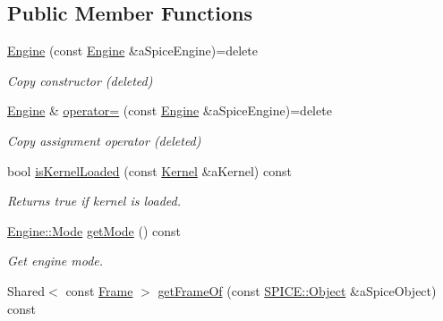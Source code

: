 \subsection*{Public Member Functions}
\begin{DoxyCompactItemize}
\item 
\hyperlink{classostk_1_1physics_1_1env_1_1ephem_1_1spice_1_1_engine_a60734f4383f29cfaaaa50126fef0ceb5}{Engine} (const \hyperlink{classostk_1_1physics_1_1env_1_1ephem_1_1spice_1_1_engine}{Engine} \&a\+Spice\+Engine)=delete
\begin{DoxyCompactList}\small\item\em Copy constructor (deleted) \end{DoxyCompactList}\item 
\hyperlink{classostk_1_1physics_1_1env_1_1ephem_1_1spice_1_1_engine}{Engine} \& \hyperlink{classostk_1_1physics_1_1env_1_1ephem_1_1spice_1_1_engine_a807af40bbe562341a66abb875fa3ab9f}{operator=} (const \hyperlink{classostk_1_1physics_1_1env_1_1ephem_1_1spice_1_1_engine}{Engine} \&a\+Spice\+Engine)=delete
\begin{DoxyCompactList}\small\item\em Copy assignment operator (deleted) \end{DoxyCompactList}\item 
bool \hyperlink{classostk_1_1physics_1_1env_1_1ephem_1_1spice_1_1_engine_aeb4efb8c50f73b90083ebd7d8a5e317f}{is\+Kernel\+Loaded} (const \hyperlink{classostk_1_1physics_1_1env_1_1ephem_1_1spice_1_1_kernel}{Kernel} \&a\+Kernel) const
\begin{DoxyCompactList}\small\item\em Returns true if kernel is loaded. \end{DoxyCompactList}\item 
\hyperlink{classostk_1_1physics_1_1env_1_1ephem_1_1spice_1_1_engine_a803b82d8f41c81e861852098b6b75ae2}{Engine\+::\+Mode} \hyperlink{classostk_1_1physics_1_1env_1_1ephem_1_1spice_1_1_engine_af7d9d424721bc7bc9d634c00699c897c}{get\+Mode} () const
\begin{DoxyCompactList}\small\item\em Get engine mode. \end{DoxyCompactList}\item 
Shared$<$ const \hyperlink{classostk_1_1physics_1_1coord_1_1_frame}{Frame} $>$ \hyperlink{classostk_1_1physics_1_1env_1_1ephem_1_1spice_1_1_engine_aeffd094033f2bd2c276b9d9a9840d7ea}{get\+Frame\+Of} (const \hyperlink{classostk_1_1physics_1_1env_1_1ephem_1_1_s_p_i_c_e_ae84db78d858cdd0a1dc3ff53090f4a1f}{S\+P\+I\+C\+E\+::\+Object} \&a\+Spice\+Object) const

\end{DoxyCompactItemize}
